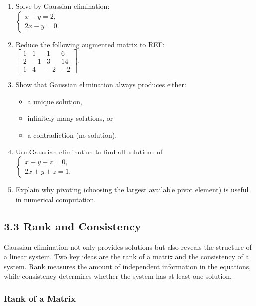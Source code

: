 \documentclass[
  12pt,
  a4paper,
]{article}
\begin{document}
\begin{enumerate}
\def\labelenumi{\arabic{enumi}.}
\item
  Solve by Gaussian elimination:\\
  \(
  \begin{cases}
  x + y = 2, \\
  2x - y = 0.
  \end{cases}
  \)
\item
  Reduce the following augmented matrix to REF:\\
  \(
  \left[\begin{array}{ccc|c}
  1 & 1 & 1 & 6 \\
  2 & -1 & 3 & 14 \\
  1 & 4 & -2 & -2
  \end{array}\right].
  \)
\item
  Show that Gaussian elimination always produces either:

  \begin{itemize}
  \item
    a unique solution,
  \item
    infinitely many solutions, or
  \item
    a contradiction (no solution).
  \end{itemize}
\item
  Use Gaussian elimination to find all solutions of\\
  \(
  \begin{cases}
  x + y + z = 0, \\
  2x + y + z = 1.
  \end{cases}
  \)
\item
  Explain why pivoting (choosing the largest available pivot element) is
  useful in numerical computation.
\end{enumerate}

\subsection{3.3 Rank and Consistency}\label{33-rank-and-consistency}

Gaussian elimination not only provides solutions but also reveals the
structure of a linear system. Two key ideas are the rank of a matrix and
the consistency of a system. Rank measures the amount of independent
information in the equations, while consistency determines whether the
system has at least one solution.

\subsubsection{Rank of a Matrix}\label{rank-of-a-matrix}
\end{document}
